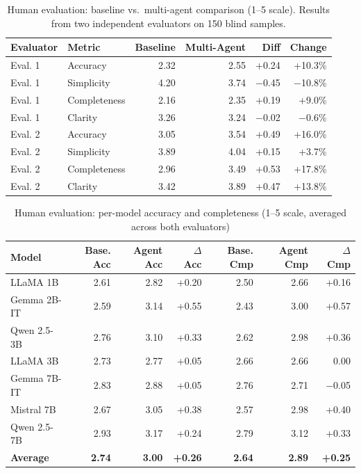 \begin{table}[h]
\centering
\caption{Human evaluation: baseline vs.\ multi-agent comparison (1--5 scale). Results from two independent evaluators on 150 blind samples.}
\label{tab:human_eval}
\begin{tabular}{llrrrr}
\toprule
\textbf{Evaluator} & \textbf{Metric} & \textbf{Baseline} & \textbf{Multi-Agent} & \textbf{Diff} & \textbf{Change} \\
\midrule
Eval. 1 & Accuracy & 2.32 & 2.55 & +0.24 & +10.3\% \\
Eval. 1 & Simplicity & 4.20 & 3.74 & $-$0.45 & $-$10.8\% \\
Eval. 1 & Completeness & 2.16 & 2.35 & +0.19 & +9.0\% \\
Eval. 1 & Clarity & 3.26 & 3.24 & $-$0.02 & $-$0.6\% \\
\midrule
Eval. 2 & Accuracy & 3.05 & 3.54 & +0.49 & +16.0\% \\
Eval. 2 & Simplicity & 3.89 & 4.04 & +0.15 & +3.7\% \\
Eval. 2 & Completeness & 2.96 & 3.49 & +0.53 & +17.8\% \\
Eval. 2 & Clarity & 3.42 & 3.89 & +0.47 & +13.8\% \\
\bottomrule
\end{tabular}
\end{table}

\begin{table}[h]
\centering
\caption{Human evaluation: per-model accuracy and completeness (1--5 scale, averaged across both evaluators)}
\label{tab:human_per_model}
\begin{tabular}{lrrrrrr}
\toprule
\textbf{Model} & \textbf{Base. Acc} & \textbf{Agent Acc} & \textbf{$\Delta$ Acc} & \textbf{Base. Cmp} & \textbf{Agent Cmp} & \textbf{$\Delta$ Cmp} \\
\midrule
LLaMA 1B & 2.61 & 2.82 & +0.20 & 2.50 & 2.66 & +0.16 \\
Gemma 2B-IT & 2.59 & 3.14 & +0.55 & 2.43 & 3.00 & +0.57 \\
Qwen 2.5-3B & 2.76 & 3.10 & +0.33 & 2.62 & 2.98 & +0.36 \\
LLaMA 3B & 2.73 & 2.77 & +0.05 & 2.66 & 2.66 & 0.00 \\
Gemma 7B-IT & 2.83 & 2.88 & +0.05 & 2.76 & 2.71 & $-$0.05 \\
Mistral 7B & 2.67 & 3.05 & +0.38 & 2.57 & 2.98 & +0.40 \\
Qwen 2.5-7B & 2.93 & 3.17 & +0.24 & 2.79 & 3.12 & +0.33 \\
\midrule
\textbf{Average} & \textbf{2.74} & \textbf{3.00} & \textbf{+0.26} & \textbf{2.64} & \textbf{2.89} & \textbf{+0.25} \\
\bottomrule
\end{tabular}
\end{table}

